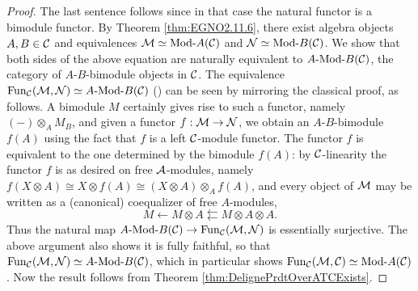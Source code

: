 \documentclass{amsart}
\begin{document}
\begin{proof}
	The last sentence follows since in that case the natural functor is a bimodule functor. By Theorem \ref{thm:EGNO2.11.6}, there exist algebra objects $A, B \in \mathcal C$ and equivalences $\cM \simeq \Mod{}{A}(\cC)$ and $\cN \simeq \Mod{}{B}(\cC)$. We show that both sides of the above equation are naturally equivalent to $\Mod{A}{B}(\cC)$, the category of $A$-$B$-bimodule objects in $\mathcal C$. The equivalence $\Fun_\cC(\cM, \cN) \simeq \Mod{A}{B}(\cC)$ (\cite[Prop 2.12.2]{EGNO}) can be seen by mirroring the classical proof, as follows. A bimodule $M$ certainly gives rise to such a functor, namely $(-) \otimes_{A} M_{B}$, 
	and given a functor $f: \mathcal M \rightarrow \mathcal N$, we obtain an $A$-$B$-bimodule $f(A)$ using the fact that $f$ is a left $\mathcal C$-module functor.  The functor $f$ is equivalent to the one determined by the bimodule $f(A)$: by $\mathcal C$-linearity the functor $f$ is as desired on free $\mathcal A$-modules, namely $f(X \otimes A) \cong X \otimes f(A)  \cong (X \otimes A) \otimes_A f(A)$, and every object of $\mathcal M$ may be written as a (canonical) coequalizer of free $A$-modules,
	\begin{equation*}
		M \leftarrow M \otimes A \leftleftarrows M \otimes A \otimes A.
	\end{equation*} 
Thus the natural map  $\Mod{A}{B}(\cC) \to \Fun_\cC(\cM, \cN)$ is essentially surjective. The above argument also shows it is fully faithful, so that $\Fun_\cC(\cM, \cN) \simeq \Mod{A}{B}(\cC)$, which in particular shows $\Fun_\cC(\cM, \cC) \simeq \Mod{}{A}(\cC)$. Now the result follows from Theorem \ref{thm:DelignePrdtOverATCExists}.
\end{proof} 
\end{document}
